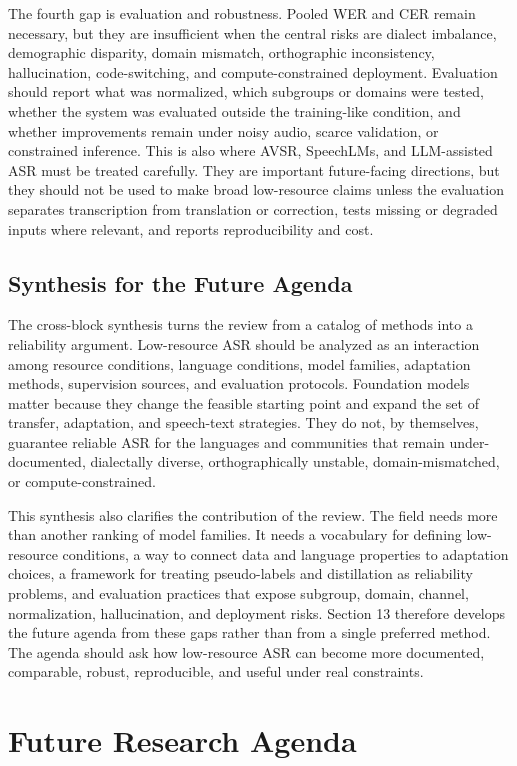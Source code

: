 \documentclass[pdflatex,sn-basic,iicol]{sn-jnl}
\theoremstyle{thmstyleone}
\theoremstyle{thmstyletwo}
\theoremstyle{thmstylethree}
\begin{document}
The fourth gap is evaluation and robustness. Pooled WER and CER remain necessary, but they are insufficient when the central risks are dialect imbalance, demographic disparity, domain mismatch, orthographic inconsistency, hallucination, code-switching, and compute-constrained deployment. Evaluation should report what was normalized, which subgroups or domains were tested, whether the system was evaluated outside the training-like condition, and whether improvements remain under noisy audio, scarce validation, or constrained inference. This is also where AVSR, SpeechLMs, and LLM-assisted ASR must be treated carefully. They are important future-facing directions, but they should not be used to make broad low-resource claims unless the evaluation separates transcription from translation or correction, tests missing or degraded inputs where relevant, and reports reproducibility and cost.

\subsection{Synthesis for the Future Agenda}

The cross-block synthesis turns the review from a catalog of methods into a reliability argument. Low-resource ASR should be analyzed as an interaction among resource conditions, language conditions, model families, adaptation methods, supervision sources, and evaluation protocols. Foundation models matter because they change the feasible starting point and expand the set of transfer, adaptation, and speech-text strategies. They do not, by themselves, guarantee reliable ASR for the languages and communities that remain under-documented, dialectally diverse, orthographically unstable, domain-mismatched, or compute-constrained.

This synthesis also clarifies the contribution of the review. The field needs more than another ranking of model families. It needs a vocabulary for defining low-resource conditions, a way to connect data and language properties to adaptation choices, a framework for treating pseudo-labels and distillation as reliability problems, and evaluation practices that expose subgroup, domain, channel, normalization, hallucination, and deployment risks. Section 13 therefore develops the future agenda from these gaps rather than from a single preferred method. The agenda should ask how low-resource ASR can become more documented, comparable, robust, reproducible, and useful under real constraints.

\section{Future Research Agenda}
\end{document}
